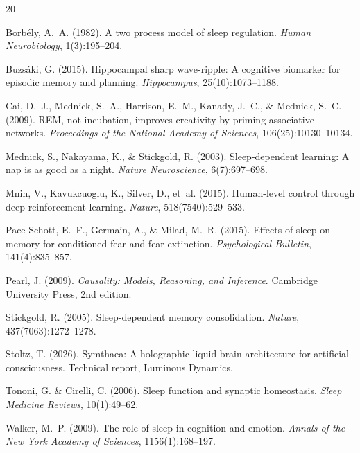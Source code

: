 \documentclass[11pt,a4paper]{article}
\begin{document}

\begin{thebibliography}{20}

Borb\'{e}ly, A.~A. (1982).
\newblock A two process model of sleep regulation.
\newblock \emph{Human Neurobiology}, 1(3):195--204.

Buzs\'{a}ki, G. (2015).
\newblock Hippocampal sharp wave-ripple: A cognitive biomarker for episodic memory and planning.
\newblock \emph{Hippocampus}, 25(10):1073--1188.

Cai, D.~J., Mednick, S.~A., Harrison, E.~M., Kanady, J.~C., \& Mednick, S.~C. (2009).
\newblock REM, not incubation, improves creativity by priming associative networks.
\newblock \emph{Proceedings of the National Academy of Sciences}, 106(25):10130--10134.

Mednick, S., Nakayama, K., \& Stickgold, R. (2003).
\newblock Sleep-dependent learning: A nap is as good as a night.
\newblock \emph{Nature Neuroscience}, 6(7):697--698.

Mnih, V., Kavukcuoglu, K., Silver, D., et~al. (2015).
\newblock Human-level control through deep reinforcement learning.
\newblock \emph{Nature}, 518(7540):529--533.

Pace-Schott, E.~F., Germain, A., \& Milad, M.~R. (2015).
\newblock Effects of sleep on memory for conditioned fear and fear extinction.
\newblock \emph{Psychological Bulletin}, 141(4):835--857.

Pearl, J. (2009).
\newblock \emph{Causality: Models, Reasoning, and Inference}.
\newblock Cambridge University Press, 2nd edition.

Stickgold, R. (2005).
\newblock Sleep-dependent memory consolidation.
\newblock \emph{Nature}, 437(7063):1272--1278.

Stoltz, T. (2026).
\newblock Symthaea: A holographic liquid brain architecture for artificial consciousness.
\newblock Technical report, Luminous Dynamics.

Tononi, G. \& Cirelli, C. (2006).
\newblock Sleep function and synaptic homeostasis.
\newblock \emph{Sleep Medicine Reviews}, 10(1):49--62.

Walker, M.~P. (2009).
\newblock The role of sleep in cognition and emotion.
\newblock \emph{Annals of the New York Academy of Sciences}, 1156(1):168--197.

\end{thebibliography}
\end{document}
